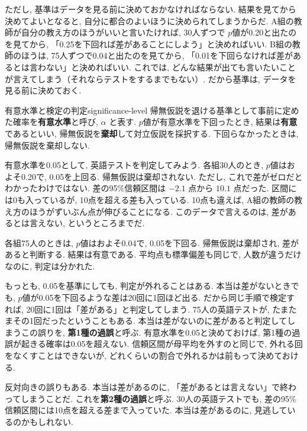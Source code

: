     ただし, 基準はデータを見る前に決めておかなければならない.
    結果を見てから決めてよいとなると, 自分に都合のよいほうに決められてしまうからだ.
    A組の教師が自分の教え方のほうがいいと言いたければ, 30人ずつで $p$値が0.20と出たのを見てから, 「0.25を下回れば差があることにしよう」と決めればいい.
    B組の教師のほうは, 75人ずつで0.04と出たのを見てから, 「0.01を下回らなければ差があるとは言わない」と決めればいい.
    これでは, どんな結果が出ても言いたいことが言えてしまう（それならテストをするまでもない）.
    だから基準は, データを見る前に決めておく.

    \begin{defi}{有意水準と検定の判定}{significance-level}
      帰無仮説を退ける基準として事前に定めた確率を\textbf{有意水準}と呼び, $\alpha$ と表す.
      $p$値が有意水準を下回ったとき, 結果は\textbf{有意}であるといい, 帰無仮説を\textbf{棄却}して対立仮説を採択する.
      下回らなかったときは, 帰無仮説を棄却しない.
    \end{defi}

    有意水準を0.05として, 英語テストを判定してみよう.
    各組30人のとき, $p$値はおよそ0.20で, 0.05を上回る.
    帰無仮説は棄却されない.
    ただし, これで差がゼロだとわかったわけではない.
    差の95\%信頼区間は $-2.1$ 点から $10.1$ 点だった.
    区間には0も入っているが, 10点を超える差も入っている.
    10点も違えば, A組の教師の教え方のほうがずいぶん点が伸びることになる.
    このデータで言えるのは, 差があるとは言えない, というところまでだ.

    各組75人のときは, $p$値はおよそ0.04で, 0.05を下回る.
    帰無仮説は棄却され, 差があると判断する.
    結果は有意である.
    平均点も標準偏差も同じで, 人数が違うだけなのに, 判定は分かれた.

    もっとも, 0.05を基準にしても, 判定が外れることはある.
    本当は差がないときでも, $p$値が0.05を下回るような差は20回に1回ほど出る.
    だから同じ手順で検定すれば, 20回に1回は「差がある」と判定してしまう.
    75人の英語テストが, たまたまその1回だったということもある.
    本当は差がないのに差があると判定してしまうこの誤りを, \textbf{第1種の過誤}と呼ぶ.
    有意水準を0.05と決めておけば, 第1種の過誤が起きる確率は0.05を超えない.
    信頼区間が母平均を外すのと同じで, 外れる回をなくすことはできないが, どれくらいの割合で外れるかは前もって決めておける.

    反対向きの誤りもある.
    本当は差があるのに, 「差があるとは言えない」で終わってしまうことだ.
    これを\textbf{第2種の過誤}と呼ぶ.
    30人の英語テストでも, 差の95\%信頼区間には10点を超える差まで入っていた.
    本当は差があるのに, 見逃しているのかもしれない.

